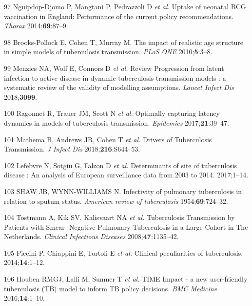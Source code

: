 \documentclass[11pt,twoside]{bristolthesis}
\begin{document}
  \leavevmode\hypertarget{ref-Nguipdop-Djomo2014}{}%
  97 Nguipdop-Djomo P, Mangtani P, Pedrazzoli D \emph{et al.} Uptake of neonatal BCG vaccination in England: Performance of the current policy recommendations. \emph{Thorax} 2014;\textbf{69}:87--9.
  
  \leavevmode\hypertarget{ref-Brooks-Pollock2010a}{}%
  98 Brooks-Pollock E, Cohen T, Murray M. The impact of realistic age structure in simple models of tuberculosis transmission. \emph{PLoS ONE} 2010;\textbf{5}:3--8.
  
  \leavevmode\hypertarget{ref-Menzies2018}{}%
  99 Menzies NA, Wolf E, Connors D \emph{et al.} Review Progression from latent infection to active disease in dynamic tuberculosis transmission models : a systematic review of the validity of modelling assumptions. \emph{Lancet Infect Dis} 2018;\textbf{3099}.
  
  \leavevmode\hypertarget{ref-Ragonnet2017}{}%
  100 Ragonnet R, Trauer JM, Scott N \emph{et al.} Optimally capturing latency dynamics in models of tuberculosis transmission. \emph{Epidemics} 2017;\textbf{21}:39--47.
  
  \leavevmode\hypertarget{ref-Mathema2018}{}%
  101 Mathema B, Andrews JR, Cohen T \emph{et al.} Drivers of Tuberculosis Transmission. \emph{J Infect Dis} 2018;\textbf{216}:S644--53.
  
  \leavevmode\hypertarget{ref-Lefebvre2017}{}%
  102 Lefebvre N, Sotgiu G, Falzon D \emph{et al.} Determinants of site of tuberculosis disease : An analysis of European surveillance data from 2003 to 2014. 2017;1--14.
  
  \leavevmode\hypertarget{ref-PMID:13148535}{}%
  103 SHAW JB, WYNN-WILLIAMS N. Infectivity of pulmonary tuberculosis in relation to sputum status. \emph{American review of tuberculosis} 1954;\textbf{69}:724--32.
  
  \leavevmode\hypertarget{ref-Tostmann2008}{}%
  104 Tostmann A, Kik SV, Kalisvaart NA \emph{et al.} Tuberculosis Transmission by Patients with Smear- Negative Pulmonary Tuberculosis in a Large Cohort in The Netherlands. \emph{Clinical Infectious Diseases} 2008;\textbf{47}:1135--42.
  
  \leavevmode\hypertarget{ref-Piccini2014}{}%
  105 Piccini P, Chiappini E, Tortoli E \emph{et al.} Clinical peculiarities of tuberculosis. 2014;\textbf{14}:1--12.
  
  \leavevmode\hypertarget{ref-Houben2016}{}%
  106 Houben RMGJ, Lalli M, Sumner T \emph{et al.} TIME Impact - a new user-friendly tuberculosis (TB) model to inform TB policy decisions. \emph{BMC Medicine} 2016;\textbf{14}:1--10.
  
\end{document}
